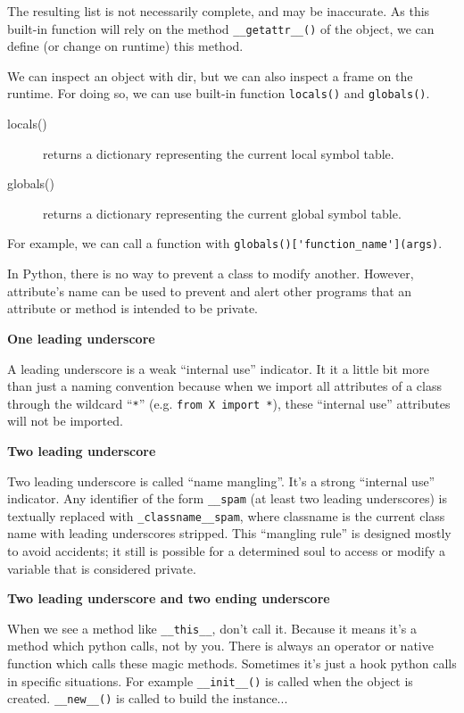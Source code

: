 \documentclass[a4paper,10pt]{article}
\begin{document}
The resulting list is not necessarily complete, and may be inaccurate. As this built-in function will rely on the method \lstinline|__getattr__()| of the object, we can define (or change on runtime) this method.

We can inspect an object with dir, but we can also inspect a frame on the runtime. For doing so, we can use built-in function \lstinline|locals()| and \lstinline|globals()|.

\begin{description}
\item[locals()] returns a dictionary representing the current local symbol table.
\item[globals()] returns a dictionary representing the current global symbol table.
\end{description}

For example, we can call a function with \lstinline|globals()['function_name'](args)|.

In Python, there is no way to prevent a class to modify another. However, attribute's name can be used to prevent and alert other programs that an attribute or method is intended to be private.

\textbf{One leading underscore}

A leading underscore is a weak ``internal use'' indicator. It it a little bit more than just a naming convention because when we import all attributes of a class through the wildcard ``\lstinline|*|'' (e.g. \lstinline|from X import *|), these ``internal use'' attributes will not be imported.

\textbf{Two leading underscore}

Two leading underscore is called ``name mangling''. It’s a strong “internal use” indicator. Any identifier of the form \lstinline|__spam| (at least two leading underscores) is textually replaced with \lstinline|_classname__spam|, where classname is the current class name with leading underscores stripped. This “mangling rule” is designed mostly to avoid accidents; it still is possible for a determined soul to access or modify a variable that is considered private.

\textbf{Two leading underscore and two ending underscore}

When we see a method like \lstinline|__this__|, don't call it. Because it means it's a method which python calls, not by you. There is always an operator or native function which calls these magic methods. Sometimes it's just a hook python calls in specific situations. For example \lstinline|__init__()| is called when the object is created. \lstinline|__new__()| is called to build the instance...
\end{document}
